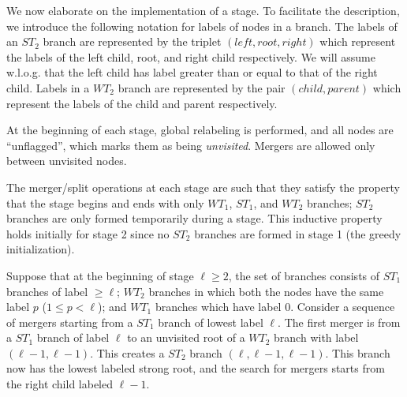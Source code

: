 \documentclass{article}
\begin{document}
We now elaborate on the implementation of a stage.  To facilitate the description, we introduce the following notation for labels of nodes in a branch. The labels of an $ST_2$ branch are represented by the triplet $(left,root,right)$ which represent the labels of the left child, root, and right child respectively. We will assume w.l.o.g. that the left child has label greater than or equal to that of the right child.  Labels in a $WT_2$ branch are represented by the pair $(child,parent)$ which represent the labels of the child and parent respectively.

At the beginning of each stage, global relabeling is performed, and all nodes are ``unflagged'', which marks them as being {\em unvisited}. Mergers are allowed only between unvisited nodes.

The merger/split operations at each stage are such that they satisfy the property that the stage begins and ends with only $WT_1$, $ST_1$, and $WT_2$ branches; $ST_2$ branches are only formed temporarily during a stage. This inductive property holds initially for stage 2 since no $ST_2$ branches are formed in stage 1 (the greedy initialization).

Suppose that at the beginning of stage $\ell \geq 2$, the set of branches consists of $ST_1$ branches of label $\geq \ell$; $WT_2$ branches in which both the nodes have the same label $p$ ($1 \leq p < \ell$); and $WT_1$ branches which have label $0$. Consider a sequence of mergers starting from a $ST_1$ branch of lowest label $\ell$.  The first merger is from a $ST_1$ branch of label $\ell$ to an unvisited root of a $WT_2$ branch with label $(\ell-1,\ell-1)$. This creates a $ST_2$ branch $(\ell, \ell-1, \ell-1)$. This branch now has the lowest labeled strong root, and the search for mergers starts from the right child labeled $\ell-1$.
\end{document}
